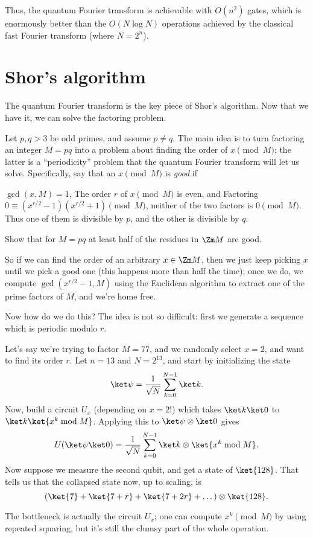 Thus, the quantum Fourier transform is achievable with $O(n^2)$ gates,
which is enormously better than the $O(N \log N)$ operations achieved by
the classical fast Fourier transform (where $N=2^n$).

\section{Shor's algorithm}
The quantum Fourier transform is the key piece of Shor's algorithm.
Now that we have it, we can solve the factoring problem.

Let $p,q > 3$ be odd primes, and assume $p \neq q$.
The main idea is to turn factoring an integer $M = pq$ into a problem
about finding the order of $x \pmod M$; the latter is a ``periodicity''
problem that the quantum Fourier transform will let us solve.
Specifically, say that an $x \pmod M$ is \emph{good} if
\begin{enumerate}[(i)]
	\ii $\gcd(x,M) = 1$,
	\ii The order $r$ of $x \pmod M$ is even, and
	\ii Factoring $0 \equiv (x^{r/2}-1)(x^{r/2}+1) \pmod M$,
	neither of the two factors is $0 \pmod M$.
	Thus one of them is divisible by $p$, and the other
	is divisible by $q$.
\end{enumerate}
\begin{exercise}
	Show that for $M = pq$ at least half of the residues
	in $\Zm M$ are good.
\end{exercise}

So if we can find the order of an arbitrary $x \in \Zm M$,
then we just keep picking $x$ until we pick a good one
(this happens more than half the time);
once we do, we compute $\gcd(x^{r/2}-1,M)$ using the Euclidean
algorithm to extract one of the prime factors of $M$, and we're home free.

Now how do we do this?  The idea is not so difficult:
first we generate a sequence which is periodic modulo $r$.
\begin{example}
	Let's say we're trying to factor $M = 77$,
	and we randomly select $x = 2$, and want to find its order $r$.
	Let $n = 13$ and $N = 2^{13}$, and start by initializing the state
	\[ \ket\psi = \frac{1}{\sqrt N} \sum_{k=0}^{N-1} \ket k. \]
	Now, build a circuit $U_x$ (depending on $x=2$!)
	which takes $\ket k \ket 0$ to $\ket k \ket{x^k \bmod M}$.
	Applying this to $\ket\psi \otimes \ket0$ gives
	\[ U(\ket\psi\ket0) =
		\frac{1}{\sqrt N} \sum_{k=0}^{N-1} \ket k \otimes \ket{x^k \bmod M}. \]
	Now suppose we measure the second qubit, and get a state of $\ket{128}$.
	That tells us that the collapsed state now, up to scaling, is
	\[ (\ket{7} + \ket{7+r} + \ket{7+2r} + \dots) \otimes \ket{128}. \]
\end{example}
The bottleneck is actually the circuit $U_x$;
one can compute $x^k \pmod M$ by using repeated squaring,
but it's still the clumsy part of the whole operation.

